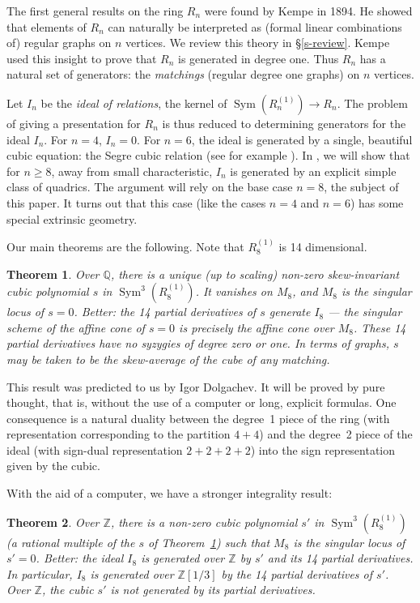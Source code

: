 \documentclass{amsart}
\newtheorem{theorem}{Theorem}[section]
\theoremstyle{definition}
\theoremstyle{remark}
\DeclareMathOperator{\Sym}{Sym}
\def\Z{\mathbb{Z}}
\def\Q{\mathbb{Q}}
\begin{document}
The first general results on the ring $R_n$ were found by Kempe \cite{Kempe}
in 1894.  He showed that elements of $R_n$ can naturally be interpreted
as (formal linear combinations of) regular graphs on $n$ vertices.  We
review this theory in \S \ref{s-review}. 
Kempe used this insight to  prove that $R_n$ is generated in degree one.
Thus $R_n$ has a natural set of generators: the \emph{matchings}
(regular degree one graphs) on
$n$ vertices.

Let $I_n$ be the {\em ideal of relations}, the kernel of
$\Sym(R_n^{(1)}) \to R_n$.  The problem of giving a presentation for
$R_n$ is thus reduced to determining generators for the ideal $I_n$.
For $n=4$, $I_n=0$.  For $n=6$, the ideal is generated by a single,
beautiful cubic equation:  the Segre cubic relation (see for example
\cite[p.~17]{DO}).  In \cite{HMSV}, we will show that for $n \geq 8$,
away from small characteristic, $I_n$ is generated by an explicit
simple class of quadrics.  The argument will rely
on the base case $n=8$, the subject of this paper.  It turns
out that this case (like the cases $n=4$ and $n=6$) has some special
extrinsic geometry.

Our main theorems are the following.  Note that $R_8^{(1)}$ is 14
dimensional.

\begin{theorem}
\label{mainthm}
Over $\Q$, there is a unique (up to scaling) non-zero skew-invariant cubic
polynomial $s$ in $\Sym^3 ( R_8^{(1)})$.  It vanishes on $M_8$, and $M_8$ is
the singular locus of $s=0$.  Better: the 14 partial derivatives of $s$
generate $I_8$ --- the singular scheme of the affine cone of $s=0$ is
precisely the affine cone over $M_8$.  These 14 partial derivatives
have no syzygies of degree zero or one.  In terms of graphs, $s$ may
be taken to be the skew-average of the cube of any matching.
\end{theorem}

This result was predicted to us by Igor Dolgachev.  It will be proved by pure
thought, that is, without the use of a computer or long, explicit formulas.
One consequence is a natural duality between the degree~1 piece of the ring
(with representation corresponding to the partition $4+4$) and the degree~2
piece of the ideal (with sign-dual representation $2+2+2+2$) into the sign
representation given by the cubic.

With the aid of a computer, we have a stronger integrality result:

\begin{theorem}
\label{mainthm2}
Over $\Z$, there is a non-zero cubic polynomial $s'$ in $\Sym^3(
R_8^{(1)})$ (a rational multiple of the $s$ of Theorem~\ref{mainthm})
such that $M_8$ is the singular locus of $s'=0$.  Better: the
ideal $I_8$ is generated over $\Z$ by $s'$ and its 14 partial
derivatives.  In particular, $I_8$ is generated over $\Z[1/3]$ by the
14 partial derivatives of $s'$.  Over $\Z$, the cubic $s'$
is not generated by its partial derivatives.
\end{theorem}
\end{document}
